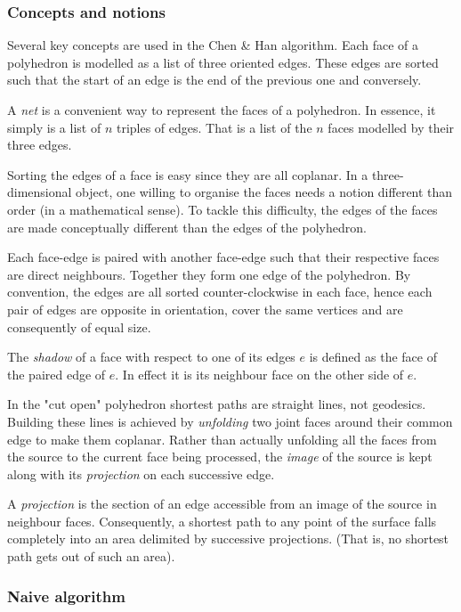 \subsubsection{Concepts and notions}

Several key concepts are used in the Chen \& Han algorithm. Each face of a polyhedron is modelled as a list of three oriented edges. These edges are sorted such that the start of an edge is the end of the previous one and conversely.\par
A \textit{net} is a convenient way to represent the faces of a polyhedron. In essence, it simply is a list of $n$ triples of edges. That is a list of the $n$ faces modelled by their three edges.\par
Sorting the edges of a face is easy since they are all coplanar. In a three-dimensional object, one willing to organise the faces needs a notion different than order (in a mathematical sense). To tackle this difficulty, the edges of the faces are made conceptually different than the edges of the polyhedron.\par
Each face-edge is paired with another face-edge such that their respective faces are direct neighbours. Together they form one edge of the polyhedron. By convention, the edges are all sorted counter-clockwise in each face, hence each pair of edges are opposite in orientation, cover the same vertices and are consequently of equal size.\par
The \textit{shadow} of a face with respect to one of its edges $e$ is defined as the face of the paired edge of $e$. In effect it is its neighbour face on the other side of $e$.\par
In the "cut open" polyhedron shortest paths are straight lines, not geodesics. Building these lines is achieved by \textit{unfolding} two joint faces around their common edge to make them coplanar. Rather than actually unfolding all the faces from the source to the current face being processed, the \textit{image} of the source is kept along with its \textit{projection} on each successive edge.\par
A \textit{projection} is the section of an edge accessible from an image of the source in neighbour faces. Consequently, a shortest path to any point of the surface falls completely into an area delimited by successive projections. (That is, no shortest path gets out of such an area).

\subsubsection{Naive algorithm}

